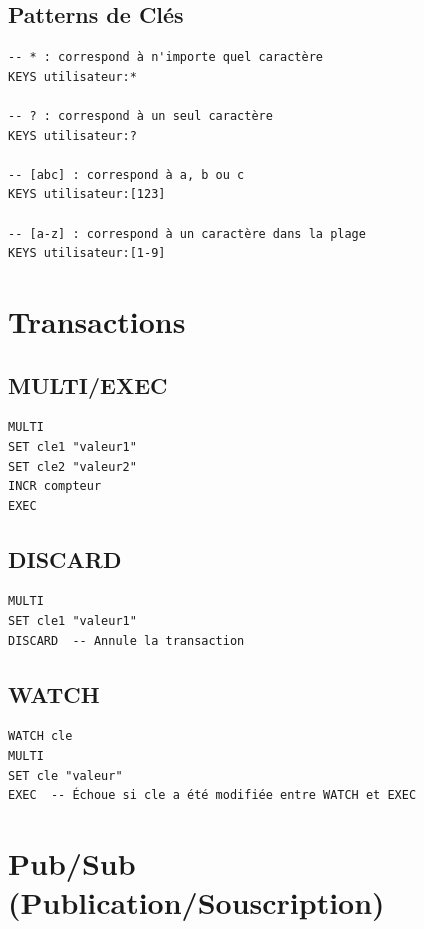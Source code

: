 \documentclass[11pt,a4paper]{article}
\begin{document}
\subsection{Patterns de Clés}

\begin{lstlisting}
-- * : correspond à n'importe quel caractère
KEYS utilisateur:*

-- ? : correspond à un seul caractère
KEYS utilisateur:?

-- [abc] : correspond à a, b ou c
KEYS utilisateur:[123]

-- [a-z] : correspond à un caractère dans la plage
KEYS utilisateur:[1-9]
\end{lstlisting}

\newpage

\section{Transactions}

\subsection{MULTI/EXEC}

\begin{lstlisting}
MULTI
SET cle1 "valeur1"
SET cle2 "valeur2"
INCR compteur
EXEC
\end{lstlisting}

\subsection{DISCARD}

\begin{lstlisting}
MULTI
SET cle1 "valeur1"
DISCARD  -- Annule la transaction
\end{lstlisting}

\subsection{WATCH}

\begin{lstlisting}
WATCH cle
MULTI
SET cle "valeur"
EXEC  -- Échoue si cle a été modifiée entre WATCH et EXEC
\end{lstlisting}

\newpage

\section{Pub/Sub (Publication/Souscription)}
\end{document}
